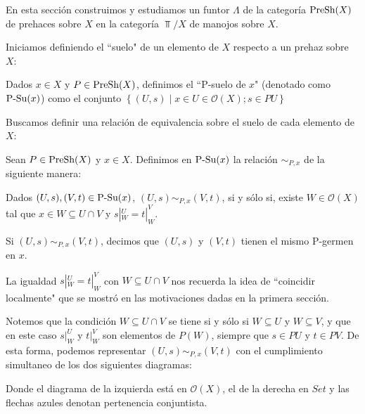 En esta sección construimos y estudiamos un funtor $\Lambda$ de la categoría $\normalfont{\text{PreSh}}(X)$ de prehaces sobre $X$ en la categoría $\Top /X$ de manojos sobre $X$.

Iniciamos definiendo el ``suelo" de un elemento de $X$ respecto a un prehaz sobre $X$:
\begin{Def}[$P$-suelo de $x$]
   Dados $x\in X$ y $P\in \normalfont{\text{PreSh}}(X)$, definimos el ``P-suelo de $x$" (denotado como $\normalfont{\text{P-Su}} (x)$) como el conjunto $\left\lbrace (U,s)\mid x\in U\in \mathcal{O}(X); s\in PU\right\rbrace$
\end{Def}
 Buscamos definir una relación de equivalencia sobre el suelo de cada elemento de $X$:
\begin{Def}
   Sean $P\in \normalfont{\text{PreSh}}(X)$ y $x\in X$. Definimos en $\normalfont{\text{P-Su}}(x)$ la relación $\sim_{P,x}$ de la siguiente manera:
   \begin{center}
      Dados $(U,s),(V,t)\in \normalfont{\text{P-Su}}(x)$, $(U,s)\sim_{P,x}(V,t)$, si y sólo si, existe $W\in\mathcal{O}(X)$ tal que $x\in W\subseteq U\cap V$ y $s|^{U}_{W}=t|^{V}_{W}$.
   \end{center}
   Si $(U,s)\sim_{P,x}(V,t)$, decimos que $(U,s)$ y $(V,t)$ tienen el mismo P-germen en $x$. 
\end{Def}
La igualdad $s|^{U}_{W}=t|^{V}_{W}$ con $W\subseteq U\cap V$ nos recuerda la idea de ``coincidir localmente" que se mostró en las motivaciones dadas en la primera sección.

Notemos que la condición $W\subseteq U\cap V$ se tiene si y sólo si $W\subseteq U$ y $W\subseteq V$, y que en este caso $s|^{U}_{W}$ y $t|^{V}_{W}$ son elementos de $P(W)$, siempre que $s\in PU$ y $t\in PV$. De esta forma, podemos representar $(U,s)\sim_{P,x}(V,t)$ con el cumplimiento simultaneo de los dos siguientes diagramas:

Donde el diagrama de la izquierda está en $\mathcal{O}(X)$, el de la derecha en $Set$ y las flechas azules denotan pertenencia conjuntista.

